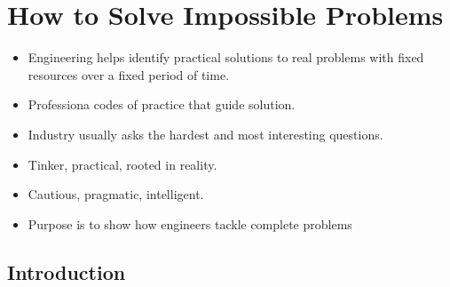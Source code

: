 \documentclass[class=report, crop=false, 12pt,a4paper]{standalone}
\begin{document}
\chapter{How to Solve Impossible Problems}
\begin{itemize}
	\item Engineering helps identify practical solutions to real problems with fixed resources over a fixed period of time.
	\item Professiona codes of practice that guide solution.
	\item Industry usually asks the hardest and most interesting questions.
	\item Tinker, practical, rooted in reality.
	\item Cautious, pragmatic, intelligent.
	\item Purpose is to show how engineers tackle complete problems
\end{itemize}
\section{Introduction}
\end{document}
